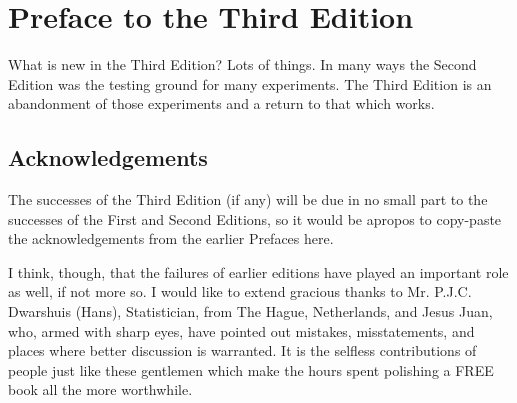 %
%

\cleardoublepage
{}
{}

\chapter*{Preface to the Third Edition}

What is new in the Third Edition? Lots of things. In many ways the Second Edition was the testing ground for many experiments. The Third Edition is an abandonment of those experiments and a return to that which works.

\section*{Acknowledgements}

The successes of the Third Edition (if any) will be due in no small part to the successes of the First and Second Editions, so it would be apropos to copy-paste the acknowledgements from the earlier Prefaces here.

I think, though, that the failures of earlier editions have played an important role as well, if not more so. I would like to extend gracious thanks to Mr. P.J.C. Dwarshuis (Hans), Statistician, from The Hague, Netherlands, and Jesus Juan, who, armed with sharp eyes, have pointed out mistakes, misstatements, and places where better discussion is warranted. It is the selfless contributions of people just like these gentlemen which make the hours spent polishing a FREE book all the more worthwhile.

\vfill{}
\cleardoublepage
{}
{}
\listoffigures

\vfill{}
\cleardoublepage
{}
{}
\listoftables

